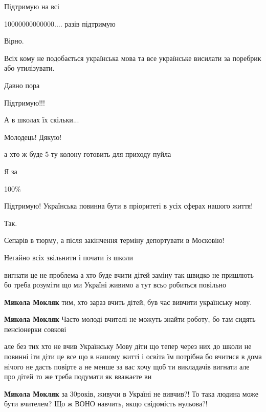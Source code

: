 \begin{itemize}
Підтримую на всі

10000000000000.... разів підтримую

Вірно.

Всіх кому не подобається українська мова та все українське висилати за поребрик або утилізувати.

Давно пора

Підтримую!!!

А в школах їх скільки...

Молодець! Дякую!

а хто ж буде 5-ту колону готовить для приходу пуйла

Я за

100\%

Підтримую! Українська повинна бути в пріоритеті в усіх сферах нашого життя!

Так.

Сепарів в тюрму, а після закінчення терміну депортувати в Московію!

Негайно всіх звільнити і почати із школи


вигнати це не проблема а хто буде вчити дітей заміну так швидко не пришлють бо
треба розуміти що ми Україні живимо а тут всьо робиться повільно

\begin{itemize} %
\textbf{Микола Мокляк} тим, хто зараз вчить дітей, був час вивчити українську мову.

\textbf{Микола Мокляк} Часто молоді вчителі не можуть знайти роботу, бо там сидять пенсіонерки совкові


але без тих хто не вчив Українську Мову діти що тепер через них до школи не
повинні іти діти це все що в нашому житті і освіта їм потрібна бо вчитися в
дома нічого не дасть повірте а не менше за вас хочу щоб ти викладачів вигнати
але про дітей то же треба подумати як вважаєте ви

\begin{itemize} %
\textbf{Микола Мокляк} за 30років, живучи в Україні не
вивчив?! То така людина може бути вчителем? Що ж ВОНО навчить, якщо свідомість
нульова?!
\end{itemize} %


\end{itemize}
\end{itemize}
